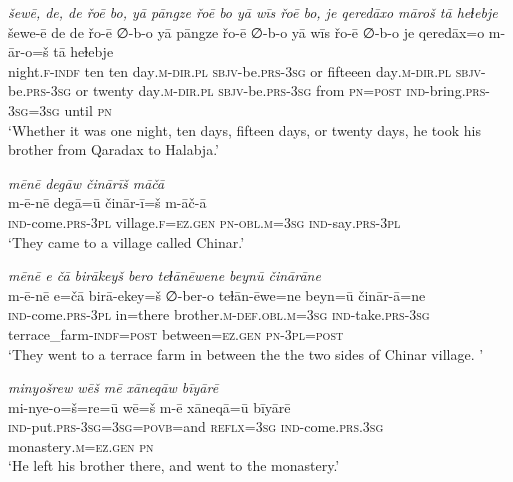 \ea \label{DG.29}
\textit{šewē, de, de řoē bo, yā pāngze řoē bo yā wīs řoē bo, je qeredāxo māroš tā heɫebje} \\ 
\gll šewe-ē de de řo-ē ∅-b-o yā pāngze řo-ē ∅-b-o yā wīs řo-ē ∅-b-o je qeredāx=o m-ār-o=š tā heɫebje \\ 
 night\textsc{\textsc{.f}}\textsc{-indf} ten ten day\textsc{.m}\textsc{-dir}\textsc{.pl} \textsc{sbjv-}be\textsc{.prs}\textsc{-3sg} or fifteeen day\textsc{.m}\textsc{-dir}\textsc{.pl} \textsc{sbjv-}be\textsc{.prs}\textsc{-3sg} or twenty day\textsc{.m}\textsc{-dir}\textsc{.pl} \textsc{sbjv-}be\textsc{.prs}\textsc{-3sg} from \textsc{pn}\textsc{=\textsc{post}} \textsc{ind-}bring\textsc{.prs}\textsc{-3sg}\textsc{=3sg} until \textsc{pn} \\ 
\glt `Whether it was one night, ten days, fifteen days, or twenty days, he took his brother from Qaradax to Halabja.'
\z 
 
\ea \label{DG.30}
\textit{mēnē degāw činārīš māčā} \\ 
\gll m-ē-nē degā=ū činār-ī=š m-āč-ā \\ 
 \textsc{ind-}come\textsc{.prs}\textsc{-3pl} village\textsc{\textsc{.f}}\textsc{=ez}\textsc{.gen} \textsc{pn}\textsc{-obl}\textsc{.m}\textsc{=3sg} \textsc{ind-}say\textsc{.prs}\textsc{-3pl} \\ 
\glt `They came to a village called Chinar.'
\z 
 
\ea \label{DG.31}
\textit{mēnē e čā birākeyš bero teɫānēwene beynū činārāne} \\ 
\gll m-ē-nē e=čā birā-ekey=š ∅-ber-o teɫān-ēwe=ne beyn=ū činār-ā=ne \\ 
 \textsc{ind-}come\textsc{.prs}\textsc{-3pl} in=there brother\textsc{.m}\textsc{-def}\textsc{.obl}\textsc{.m}\textsc{=3sg} \textsc{ind-}take\textsc{.prs}\textsc{-3sg} terrace\_farm\textsc{-indf}\textsc{=\textsc{post}} between\textsc{=ez}\textsc{.gen} \textsc{pn}\textsc{-3pl}\textsc{=\textsc{post}} \\ 
\glt `They went to a terrace farm in between the the two sides of Chinar village. '
\z 
 
\ea \label{DG.32}
\textit{minyošrew wēš mē xāneqāw bīyārē} \\ 
\gll mi-nye-o=š=re=ū wē=š m-ē xāneqā=ū bīyārē \\ 
 \textsc{ind-}put\textsc{.prs}\textsc{-3sg}\textsc{=3sg}\textsc{=\textsc{povb}}=and \textsc{reflx}\textsc{=3sg} \textsc{ind-}come\textsc{.prs}\textsc{.3sg} monastery\textsc{.m}\textsc{=ez}\textsc{.gen} \textsc{pn} \\ 
\glt `He left his brother there, and went to the monastery.'
\z 
 
